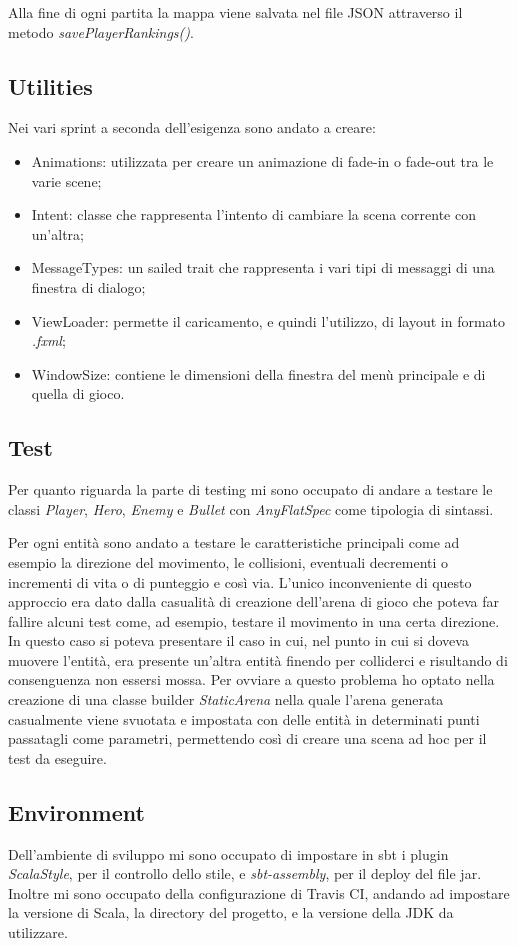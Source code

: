 Alla fine di ogni partita la mappa viene salvata nel file JSON attraverso il metodo \textit{savePlayerRankings()}.

\subsection{Utilities}
Nei vari sprint a seconda dell'esigenza sono andato a creare:
\begin{itemize}
	\item Animations: utilizzata per creare un animazione di fade-in o fade-out tra le varie scene;
	\item Intent: classe che rappresenta l'intento di cambiare la scena corrente con un'altra;
	\item MessageTypes: un sailed trait che rappresenta i vari tipi di messaggi di una finestra di dialogo;
	\item ViewLoader: permette il caricamento, e quindi l'utilizzo, di layout in formato \textit{.fxml};
	\item WindowSize: contiene le dimensioni della finestra del menù principale e di quella di gioco.
		
\end{itemize}

\subsection{Test}
Per quanto riguarda la parte di testing mi sono occupato di andare a testare le classi \textit{Player}, \textit{Hero}, \textit{Enemy} e \textit{Bullet} con \textit{AnyFlatSpec} come tipologia di sintassi.

Per ogni entità sono andato a testare le caratteristiche principali come ad esempio la direzione del movimento, le collisioni, eventuali decrementi o incrementi di vita o di punteggio e così via.
L'unico inconveniente di questo approccio era dato dalla casualità di creazione dell'arena di gioco che poteva far fallire alcuni test come, ad esempio, testare il movimento in una certa direzione.
In questo caso si poteva presentare il caso in cui, nel punto in cui si doveva muovere l'entità, era presente un'altra entità finendo per colliderci e risultando di consenguenza non essersi mossa.
Per ovviare a questo problema ho optato nella creazione di una classe builder \textit{StaticArena} nella quale l'arena generata casualmente viene svuotata e impostata con delle entità in determinati punti passatagli come parametri, permettendo così di creare una scena ad hoc per il test da eseguire.

\subsection{Environment}
Dell'ambiente di sviluppo mi sono occupato di impostare in sbt i plugin \textit{ScalaStyle}, per il controllo dello stile, e \textit{sbt-assembly}, per il deploy del file jar.
Inoltre mi sono occupato della configurazione di Travis CI, andando ad impostare la versione di Scala, la directory del progetto, e la versione della JDK da utilizzare.
